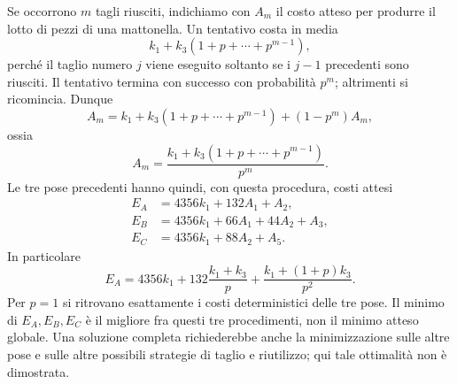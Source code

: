 {Se occorrono $m$ tagli riusciti, indichiamo con $A_m$ il costo atteso
per produrre il lotto di pezzi di una mattonella. Un tentativo costa
in media
\[
 k_1+k_3(1+p+\cdots+p^{m-1}),
\]
perch\'e il taglio numero $j$ viene eseguito soltanto se i $j-1$
precedenti sono riusciti. Il tentativo termina con successo con
probabilit\`a $p^m$; altrimenti si ricomincia. Dunque
\[
 A_m=k_1+k_3(1+p+\cdots+p^{m-1})+(1-p^m)A_m,
\]
ossia
\[
 \boxed{A_m=\frac{k_1+k_3(1+p+\cdots+p^{m-1})}{p^m}.}
\]
Le tre pose precedenti hanno quindi, con questa procedura, costi attesi
\[
 \begin{aligned}
 E_A&=4356k_1+132A_1+A_2,\\
 E_B&=4356k_1+66A_1+44A_2+A_3,\\
 E_C&=4356k_1+88A_2+A_5.
 \end{aligned}
\]
In particolare
\[
 E_A=4356k_1+132\frac{k_1+k_3}{p}
              +\frac{k_1+(1+p)k_3}{p^2}.
\]
Per $p=1$ si ritrovano esattamente i costi deterministici delle tre pose.
Il minimo di $E_A,E_B,E_C$ \`e il migliore fra questi tre procedimenti,
non il minimo atteso globale. Una soluzione completa richiederebbe
anche la minimizzazione sulle altre pose e sulle altre possibili
strategie di taglio e riutilizzo; qui tale ottimalit\`a non \`e dimostrata.
}
\renewcommand{\SoluzioniAlternative}{}
\renewcommand{\Osservazioni}{}
\renewcommand{\Commenti}{}
